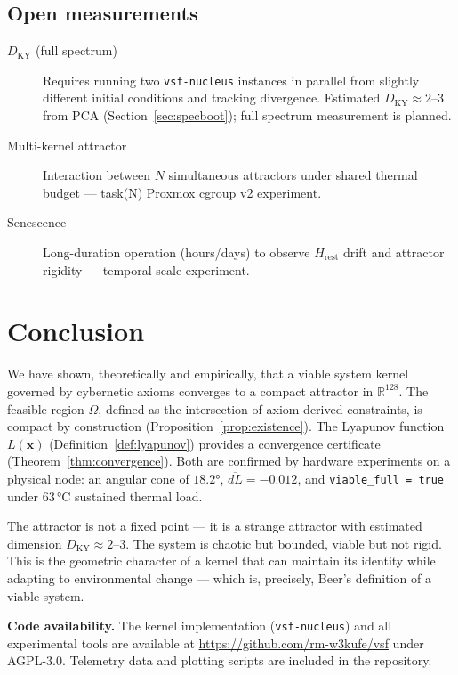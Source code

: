\documentclass[11pt, a4paper]{article}
\newcommand{\R}{\mathbb{R}}
\newcommand{\sv}{\bm{x}}
\newcommand{\nucleus}{\texttt{vsf-nucleus}}
\begin{document}
\subsection{Open measurements}

\begin{description}
  \item[$D_\text{KY}$ (full spectrum)]
    Requires running two \nucleus{} instances in parallel from
    slightly different initial conditions and tracking divergence.
    Estimated $D_\text{KY} \approx 2$--$3$ from PCA (Section~\ref{sec:specboot});
    full spectrum measurement is planned.
  \item[Multi-kernel attractor]
    Interaction between $N$ simultaneous attractors under shared
    thermal budget — task(N) Proxmox cgroup v2 experiment.
  \item[Senescence]
    Long-duration operation (hours/days) to observe $H_\text{rest}$
    drift and attractor rigidity — temporal scale experiment.
\end{description}


\section{Conclusion}
\label{sec:conclusion}

We have shown, theoretically and empirically, that a viable system kernel
governed by cybernetic axioms converges to a compact attractor in $\R^{128}$.
The feasible region $\Omega$, defined as the intersection of axiom-derived
constraints, is compact by construction (Proposition~\ref{prop:existence}).
The Lyapunov function $L(\sv)$ (Definition~\ref{def:lyapunov}) provides
a convergence certificate (Theorem~\ref{thm:convergence}).
Both are confirmed by hardware experiments on a physical node:
an angular cone of $18.2°$, $\overline{dL} = -0.012$, and
\texttt{viable\_full = true} under 63\,°C sustained thermal load.

The attractor is not a fixed point — it is a strange attractor with
estimated dimension $D_\text{KY} \approx 2$--$3$.
The system is chaotic but bounded, viable but not rigid.
This is the geometric character of a kernel that can maintain its
identity while adapting to environmental change — which is, precisely,
Beer's definition of a viable system.

\bigskip
\noindent\textbf{Code availability.}
The kernel implementation (\nucleus{}) and all experimental tools are
available at \url{https://github.com/rm-w3kufe/vsf} under AGPL-3.0.
Telemetry data and plotting scripts are included in the repository.
\end{document}
